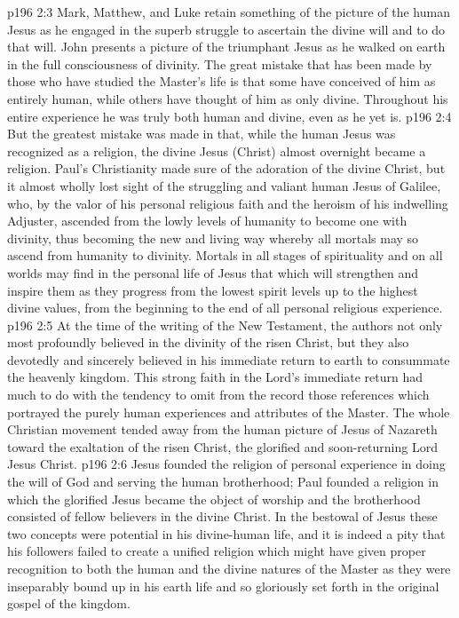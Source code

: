 \vs p196 2:3 Mark, Matthew, and Luke retain something of the picture of the human Jesus as he engaged in the superb struggle to ascertain the divine will and to do that will. John presents a picture of the triumphant Jesus as he walked on earth in the full consciousness of divinity. The great mistake that has been made by those who have studied the Master’s life is that some have conceived of him as entirely human, while others have thought of him as only divine. Throughout his entire experience he was truly both human and divine, even as he yet is.
\vs p196 2:4 But the greatest mistake was made in that, while the human Jesus was recognized as  a religion, the divine Jesus (Christ) almost overnight became a religion. Paul’s Christianity made sure of the adoration of the divine Christ, but it almost wholly lost sight of the struggling and valiant human Jesus of Galilee, who, by the valor of his personal religious faith and the heroism of his indwelling Adjuster, ascended from the lowly levels of humanity to become one with divinity, thus becoming the new and living way whereby all mortals may so ascend from humanity to divinity. Mortals in all stages of spirituality and on all worlds may find in the personal life of Jesus that which will strengthen and inspire them as they progress from the lowest spirit levels up to the highest divine values, from the beginning to the end of all personal religious experience.
\vs p196 2:5 At the time of the writing of the New Testament, the authors not only most profoundly believed in the divinity of the risen Christ, but they also devotedly and sincerely believed in his immediate return to earth to consummate the heavenly kingdom. This strong faith in the Lord’s immediate return had much to do with the tendency to omit from the record those references which portrayed the purely human experiences and attributes of the Master. The whole Christian movement tended away from the human picture of Jesus of Nazareth toward the exaltation of the risen Christ, the glorified and soon\hyp{}returning Lord Jesus Christ.
\pc \vs p196 2:6 Jesus founded the religion of personal experience in doing the will of God and serving the human brotherhood; Paul founded a religion in which the glorified Jesus became the object of worship and the brotherhood consisted of fellow believers in the divine Christ. In the bestowal of Jesus these two concepts were potential in his divine\hyp{}human life, and it is indeed a pity that his followers failed to create a unified religion which might have given proper recognition to both the human and the divine natures of the Master as they were inseparably bound up in his earth life and so gloriously set forth in the original gospel of the kingdom.
